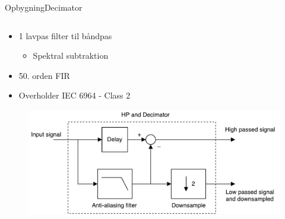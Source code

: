 \begin{frame}{Opbygning}{Decimator}
\begin{columns}
  \begin{column}{0.6\textwidth}
\begin{itemize}
\item 1 lavpas filter til båndpas
\begin{itemize}
\item Spektral subtraktion
\end{itemize}
\item 50. orden FIR
\item Overholder IEC 6964 - Class 2 
\end{itemize}
\begin{figure}
\centering
\includegraphics[width=\textwidth]{designRealDecimator}
\end{figure}
  \end{column}
\end{columns}
\end{frame}

